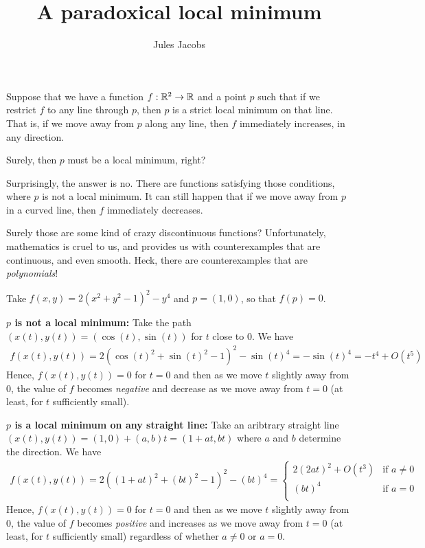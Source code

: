 

\newcommand{\tac}[1]{\lstinline[mathescape]~#1~}
\newcommand{\ciff}{\ \leftrightarrow\ }
\newcommand{\hyp}{\tac{H}}
\newcommand{\hypB}{\tac{G}}
\newcommand{\var}{\tac{x}}
\newcommand{\varB}{\tac{y}}

\newtheorem*{nlemma}{Lemma}


\title{A paradoxical local minimum}
\author{Jules Jacobs}


\maketitle
Suppose that we have a function $f : \mathbb{R}^2 \to \mathbb{R}$ and a point $p$ such that if we restrict $f$ to any line through $p$, then $p$ is a strict local minimum on that line.
That is, if we move away from $p$ along any line, then $f$ immediately increases, in any direction.

Surely, then $p$ must be a local minimum, right?

Surprisingly, the answer is no. There are functions satisfying those conditions, where $p$ is not a local minimum.
It can still happen that if we move away from $p$ in a curved line, then $f$ immediately decreases.

Surely those are some kind of crazy discontinuous functions?
Unfortunately, mathematics is cruel to us, and provides us with counterexamples that are continuous, and even smooth. Heck, there are counterexamples that are \emph{polynomials}!

Take $f(x,y) = 2(x^2 + y^2 - 1)^2 - y^4$ and $p = (1,0)$, so that $f(p) = 0$.

\textbf{$p$ is not a local minimum:}
Take the path $(x(t),y(t)) = (\cos(t),\sin(t))$ for $t$ close to $0$. We have
\begin{align*}
  f(x(t),y(t)) = 2(\cos(t)^2 + \sin(t)^2 - 1)^2 - \sin(t)^4 = -\sin(t)^4 = -t^4 + O(t^5)
\end{align*}
Hence, $f(x(t),y(t)) = 0$ for $t = 0$ and then as we move $t$ slightly away from $0$, the value of $f$ becomes \emph{negative} and decrease as we move away from $t=0$ (at least, for $t$ sufficiently small).

\textbf{$p$ is a local minimum on any straight line:}
Take an aribtrary straight line $(x(t),y(t)) = (1,0) + (a,b)t = (1 + at, bt)$ where $a$ and $b$ determine the direction. We have
\begin{align*}
  f(x(t),y(t))
    = 2((1 + at)^2 + (bt)^2 - 1)^2 - (bt)^4
    = \begin{cases}
      2(2at)^2 + O(t^3) & \text{if $a \neq 0$} \\
      (bt)^4 & \text{if $a = 0$} \\
    \end{cases}
\end{align*}
Hence, $f(x(t),y(t)) = 0$ for $t = 0$ and then as we move $t$ slightly away from $0$, the value of $f$ becomes \emph{positive} and increases as we move away from $t=0$ (at least, for $t$ sufficiently small) regardless of whether $a \neq 0$ or $a = 0$.

